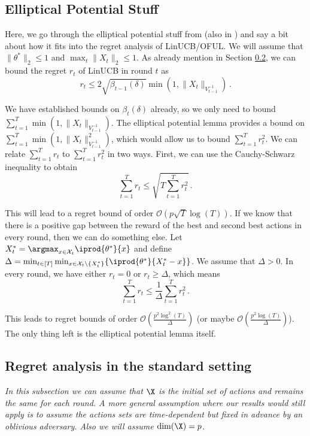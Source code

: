 \subsection{Elliptical Potential Stuff}
\label{app::sec:elliptical_potential}

Here, we go through the elliptical potential stuff from \citet{abbasi2011improved} (also in \citet{lattimore2020bandit}) and say a bit about how it fits into the regret analysis of LinUCB/OFUL. We will assume that $\|\theta^*\|_2 \leq 1$ and $\max_{t}\|X_t\|_2 \leq 1$. As already mention in Section \ref{subsec:regret_analysis_standard}, we can bound the regret $r_t$ of LinUCB in round $t$ as
\begin{equation*}
r_t \leq 2\sqrt{\beta_{t-1}(\delta)}\min(1, \|X_t\|_{V_{t-1}^{-1}})\,.
\end{equation*}

We have established bounds on $\beta_t(\delta)$ already, so we only need to bound $\sum_{t=1}^{T}\min(1, \|X_t\|_{V_{t-1}^{-1}})$. The elliptical potential lemma provides a bound on $\sum_{t=1}^{T}\min(1, \|X_t\|_{V_{t-1}^{-1}}^2)$, which would allow us to bound $\sum_{t=1}^{T}r_t^2$. We can relate $\sum_{t=1}^{T}r_t$ to $\sum_{t=1}^{T}r_t^2$ in two ways. First, we can use the Cauchy-Schwarz inequality to obtain
\begin{equation*}
\sum_{t=1}^{T}r_t \leq \sqrt{T\sum_{t=1}^{T}r_t^2}\,.
\end{equation*}

This will lead to a regret bound of order $\mathcal{O}(p\sqrt{T}\log(T))$. If we know that there is a positive gap between the reward of the best and second best actions in every round, then we can do something else. Let $X_t^* = \argmax_{x \in \mathcal{X}_t}\iprod{\theta^*}{x}$ and define $\Delta = \min_{t \in [T]}\min_{x \in \mathcal{X}_t\setminus\{X_t^*\}}\{\iprod{\theta^*}{X_t^* - x}\}$. We assume that $\Delta > 0$. In every round, we have either $r_t = 0$ or $r_t \geq \Delta$, which means
\begin{equation*}
\sum_{t=1}^{T}r_t \leq \frac{1}{\Delta}\sum_{t=1}^{T}r_t^2\,.
\end{equation*}

This leads to regret bounds of order $\mathcal{O}(\frac{p^2\log^2(T)}{\Delta})$ (or maybe $\mathcal{O}(\frac{p^2\log(T)}{\Delta})$). The only thing left is the elliptical potential lemma itself.



\subsection{Regret analysis in the standard setting}
\label{subsec:regret_analysis_standard}
\textit{In this subsection we can assume that $\X$ is the initial set of actions and remains the same for each round. A more general assumption where our results would still apply is to assume the actions sets are time-dependent but fixed in advance by an oblivious adversary. Also we will assume $\dim(\X)=p$.}
\\

